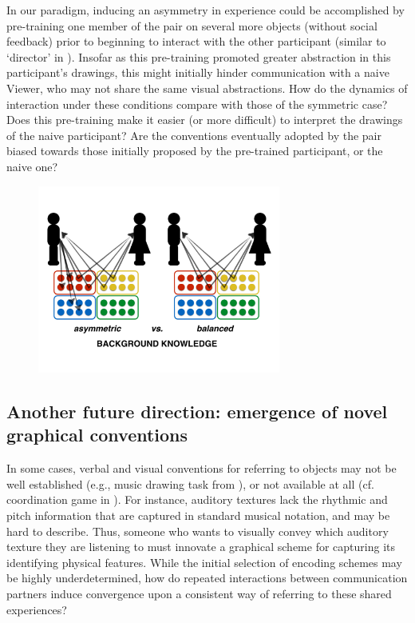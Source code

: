 \documentclass[12pt]{article}
\begin{document}
In our paradigm, inducing an asymmetry in experience could be accomplished by pre-training one member of the pair on several more objects (without social feedback) prior to beginning to interact with the other participant (similar to `director' in ). Insofar as this pre-training promoted greater abstraction in this participant's drawings, this might initially hinder communication with a naive Viewer, who may not share the same visual abstractions. How do the dynamics of interaction under these conditions compare with those of the symmetric case? Does this pre-training make it easier (or more difficult) to interpret the drawings of the naive participant? Are the conventions eventually adopted by the pair biased towards those initially proposed by the pre-trained participant, or the naive one? 

\begin{figure}[hbtp]
\begin{center}
\includegraphics[width=80mm]{figures/background_knowledge.pdf}
\end{center}
\end{figure}
\vspace{-5mm}


\subsection{Another future direction: emergence of novel graphical conventions}

In some cases, verbal and visual conventions for referring to objects may not be well established (e.g., music drawing task from ), or not available at all (cf. coordination game in ). For instance, auditory textures \cite{McDermott:2013ky} lack the rhythmic and pitch information that are captured in standard musical notation, and may be hard to describe. Thus, someone who wants to visually convey which auditory texture they are listening to must innovate a graphical scheme for capturing its identifying physical features. While the initial selection of encoding schemes may be highly underdetermined, how do repeated interactions between communication partners induce convergence upon a consistent way of referring to these shared experiences?


\setlength{\bibleftmargin}{.125in}
\setlength{\bibindent}{-\bibleftmargin}

\end{document}
